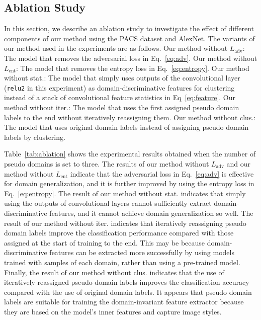 \documentclass[letterpaper]{article} \usepackage{aaai20}  \usepackage{times}  \usepackage{helvet} \usepackage{courier}  \usepackage[hyphens]{url}  \usepackage{graphicx} \urlstyle{rm} \def\UrlFont{\rm}  \usepackage{graphicx}  \usepackage[whole]{bxcjkjatype}
\begin{document}
\subsection{Ablation Study}
In this section, we describe an ablation study to investigate the effect of different components of our method using the PACS dataset and AlexNet.
The variants of our method used in the experiments are as follows. Our method without $L_{\mathrm{adv}}$: The model that removes the adversarial loss in Eq.~\ref{eq:adv}. Our method without $L_{\mathrm{ent}}$: The model that removes the entropy loss in Eq.~\ref{eq:entropy}. Our method without stat.: The model that simply uses outputs of the convolutional layer (\texttt{relu2} in this experiment) as domain-discriminative features for clustering instead of a stack of convolutional feature statistics in Eq~\ref{eq:feature}. Our method without iter.: The model that uses the first assigned pseudo domain labels to the end without iteratively reassigning them. Our method without clus.: The model that uses original domain labels instead of assigning pseudo domain labels by clustering.\par 
Table~\ref{tab:ablation} shows the experimental results obtained when the number of pseudo domains is set to three. The results of our method without $L_{\mathrm{adv}}$ and our method without $L_{\mathrm{ent}}$ indicate that the adversarial loss in Eq.~\ref{eq:adv} is effective for domain generalization, and it is further improved by using the entropy loss in Eq.~\ref{eq:entropy}. The result of our method without stat. indicates that simply using the outputs of convolutional layers cannot sufficiently extract domain-discriminative features, and it cannot achieve domain generalization so well.
The result of our method without iter. indicates that iteratively reassigning pseudo domain labels improve the classification performance compared with those assigned at the start of training to the end. This may be because domain-discriminative features can be extracted more successfully by using models trained with samples of each domain, rather than using a pre-trained model.
Finally, the result of our method without clus. indicates that the use of iteratively reassigned pseudo domain labels improves the classification accuracy compared with the use of original domain labels. It appears that pseudo domain labels are suitable for training the domain-invariant feature extractor because they are based on the model's inner features and capture image styles.
\end{document}
